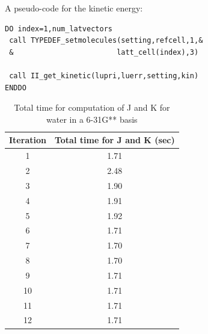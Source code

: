 \documentclass[12pt,a4paper,english]{beamer}
\newcommand{\braopket}[3]{\langle #1|#2|#3\rangle}
\begin{document}

%
\begin{frame}[fragile]

  A pseudo-code for the kinetic energy:

\begin{lstlisting}
DO index=1,num_latvectors
 call TYPEDEF_setmolecules(setting,refcell,1,&
 &                        latt_cell(index),3)

 call II_get_kinetic(lupri,luerr,setting,kin)
ENDDO
\end{lstlisting}
  
  



\end{frame}
\begin{frame}
        \begin{table}
                \centering
                \begin{tabular}{|c|c|}
                         Iteration & Total time for J and K (sec) \\
\hline
                         1 &  1.71\\ 
                         2 &  2.48\\ 
                         3 &  1.90\\ 
                         4 &  1.91\\ 
                         5 &  1.92\\ 
                         6 &  1.71\\ 
                         7 &  1.70\\ 
                         8 &  1.70\\ 
                         9 &  1.71\\ 
                        10 &  1.71\\ 
                        11 &  1.71\\ 
                        12 &  1.71\\ 
\hline
                \end{tabular}
                \caption{Total time for computation of J and K for water in a 6-31G** basis}
                \label{tab:1}
        \end{table}
\end{frame}
\end{document}

